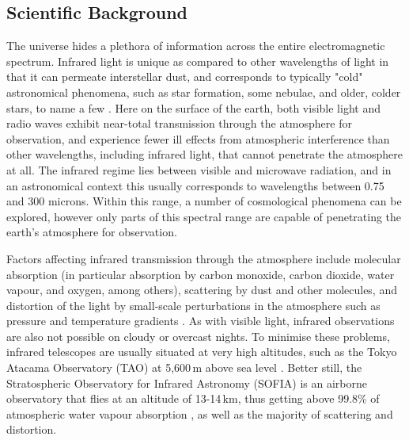 \subsection{Scientific Background}

The universe hides a plethora of information across the entire electromagnetic spectrum. Infrared light is unique as compared to other wavelengths of light in that it can permeate interstellar dust, and corresponds to typically "cold" astronomical phenomena, such as star formation, some nebulae, and older, colder stars, to name a few \cite{AstroTargets}. Here on the surface of the earth, both visible light and radio waves exhibit near-total transmission through the atmosphere for observation, and experience fewer ill effects from atmospheric interference than other wavelengths, including infrared light, that cannot penetrate the atmosphere at all. The infrared regime lies between visible and microwave radiation, and in an astronomical context this usually corresponds to wavelengths between 0.75 and 300 microns. Within this range, a number of cosmological phenomena can be explored, however only parts of this spectral range are capable of penetrating the earth's atmosphere for observation.

Factors affecting infrared transmission through the atmosphere include molecular absorption (in particular absorption by carbon monoxide, carbon dioxide, water vapour, and oxygen, among others), scattering by dust and other molecules, and distortion of the light by small-scale perturbations in the atmosphere such as pressure and temperature gradients \cite{AstroToday}. As with visible light, infrared observations are also not possible on cloudy or overcast nights. To minimise these problems, infrared telescopes are usually situated at very high altitudes, such as the Tokyo Atacama Observatory (TAO) at 5,600\,m above sea level \cite{TAO}. Better still, the Stratospheric Observatory for Infrared Astronomy (SOFIA) is an airborne observatory that flies at an altitude of 13-14\,km, thus getting above 99.8\% of atmospheric water vapour absorption \cite{SOFIA}, as well as the majority of scattering and distortion.
